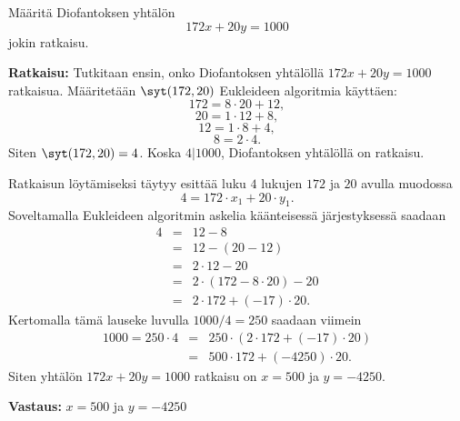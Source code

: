 \begin{esimerkki}
Määritä Diofantoksen yhtälön
\[
172x + 20y = 1000
\]
jokin ratkaisu.

{\bf Ratkaisu:} Tutkitaan ensin, onko Diofantoksen yhtälöllä $172x + 20y = 1000$ ratkaisua. Määritetään $\syt(172,20)$ Eukleideen algoritmia käyttäen:
\[
172 = 8 \cdot 20 +12,
\]
\[
20 = 1\cdot 12 + 8,
\]
\[
12 = 1 \cdot 8 +4,
\]
\[
8=2\cdot 4.
\]
Siten $\syt(172,20)=4$. Koska $4|1000$, Diofantoksen yhtälöllä on ratkaisu.

Ratkaisun löytämiseksi täytyy esittää luku $4$ lukujen $172$ ja $20$ avulla muodossa 
\[
4=172\cdot x_1 + 20 \cdot y_1.
\]
Soveltamalla Eukleideen algoritmin askelia käänteisessä järjestyksessä saadaan
\begin{eqnarray*}
4 &=& 12 - 8\\
  &=& 12-(20-12) \\
  &=& 2\cdot 12-20 \\
  &=& 2 \cdot (172-8\cdot 20)-20 \\
  &=& 2\cdot 172 +(-17) \cdot 20.
\end{eqnarray*}
Kertomalla tämä lauseke luvulla $1000/4=250$ saadaan viimein
\begin{eqnarray*}
1000 = 250\cdot 4 &=& 250 \cdot (2\cdot 172 +(-17) \cdot 20) \\
 &=& 500\cdot 172 + (-4250) \cdot 20.
\end{eqnarray*}
Siten yhtälön $172x + 20y = 1000$ ratkaisu on $x=500$ ja $y=-4250$.

{\bf Vastaus:} $x=500$ ja $y=-4250$
\end{esimerkki}

